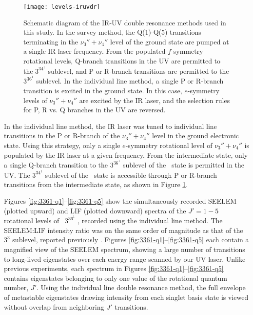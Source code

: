 \documentclass[12pt]{mitthesis}
\begin{document}
\begin{figure}
  \centering
  
  \texttt{[image: levels-iruvdr]}

  \caption{Schematic diagram of the IR-UV double resonance methods
    used in this study.  In the survey method, the Q(1)-Q(5)
    transitions terminating in the $\nu_3''+\nu_4''$ level of the
    ground state are pumped at a single IR laser frequency.  From the
    populated $f$-symmetry rotational levels, Q-branch transitions in
    the UV are permitted to the $3^34^1$  sublevel, and P or
    R-branch transitions are permitted to the $3^36^1$ 
    sublevel.  In the individual line method, a single P or R-branch
    transition is excited in the ground state.  In this case,
    $e$-symmetry levels of $\nu_3''+\nu_4''$ are excited by the IR
    laser, and the selection rules for P, R vs. Q branches in the UV
    are reversed.}
  \label{fig:levels-iruvdr}
\end{figure}

In the individual line method, the IR laser was tuned to individual line
transitions in the P or R-branch of the $\nu_3''+\nu_4''$ level in the
ground electronic state.  Using this strategy, only a single
$e$-symmetry rotational level of $\nu_3''+\nu_4''$ is populated by the
IR laser at a given frequency.  From the intermediate state, only a
single Q-branch transition to the $3^36^1$  sublevel of the
\astate\ state is permitted in the UV.  The $3^34^1$  sublevel
of the \astate\ state is accessible through P or R-branch transitions
from the intermediate state, as shown in Figure
\ref{fig:levels-iruvdr}.


Figures \ref{fig:3361-q1}--\ref{fig:3361-q5} show the simultaneously
recorded SEELEM (plotted upward) and LIF (plotted downward) spectra of
the $J'=1-5$ rotational levels of \astate\ $3^36^1$ , recorded
using the individual line method.  The SEELEM:LIF intensity ratio was on
the same order of magnitude as that of the $3^3$  sublevel,
reported previously \cite{mishra04}. Figures
\ref{fig:3361-q1}--\ref{fig:3361-q5} each contain a magnified view of
the SEELEM spectrum, showing a large number of transitions to
long-lived eigenstates over each energy range scanned by our UV laser.
Unlike previous experiments, each spectrum in Figures
\ref{fig:3361-q1}--\ref{fig:3361-q5} contains eigenstates belonging to only
one value of the rotational quantum number, $J'$.  Using the individual line
double resonance method, the full envelope of metastable eigenstates
drawing intensity from each singlet basis state is viewed without
overlap from neighboring $J'$ transitions.
\end{document}
